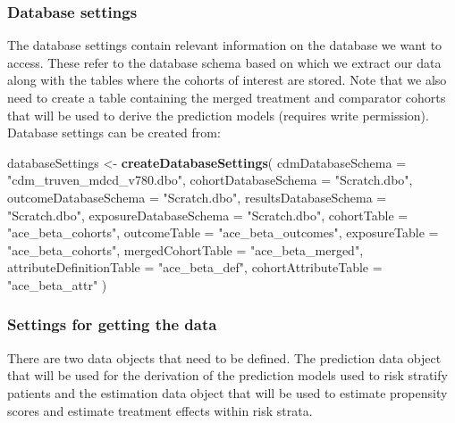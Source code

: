 \documentclass[]{article}
\newenvironment{Shaded}{\begin{snugshade}}{\end{snugshade}}
\newcommand{\DataTypeTok}[1]{\textcolor[rgb]{0.13,0.29,0.53}{#1}}
\newcommand{\KeywordTok}[1]{\textcolor[rgb]{0.13,0.29,0.53}{\textbf{#1}}}
\newcommand{\NormalTok}[1]{#1}
\newcommand{\StringTok}[1]{\textcolor[rgb]{0.31,0.60,0.02}{#1}}
\begin{document}
\hypertarget{database-settings}{%
\subsubsection{Database settings}\label{database-settings}}

The database settings contain relevant information on the database we
want to access. These refer to the database schema based on which we
extract our data along with the tables where the cohorts of interest are
stored. Note that we also need to create a table containing the merged
treatment and comparator cohorts that will be used to derive the
prediction models (requires write permission). Database settings can be
created from:

\begin{Shaded}
\begin{Highlighting}[]
\NormalTok{databaseSettings <{-}}\StringTok{ }\KeywordTok{createDatabaseSettings}\NormalTok{(}
  \DataTypeTok{cdmDatabaseSchema =} \StringTok{"cdm\_truven\_mdcd\_v780.dbo"}\NormalTok{,}
  \DataTypeTok{cohortDatabaseSchema =} \StringTok{"Scratch.dbo"}\NormalTok{,}
  \DataTypeTok{outcomeDatabaseSchema =} \StringTok{"Scratch.dbo"}\NormalTok{,}
  \DataTypeTok{resultsDatabaseSchema =} \StringTok{"Scratch.dbo"}\NormalTok{,}
  \DataTypeTok{exposureDatabaseSchema =} \StringTok{"Scratch.dbo"}\NormalTok{,}
  \DataTypeTok{cohortTable =} \StringTok{"ace\_beta\_cohorts"}\NormalTok{,}
  \DataTypeTok{outcomeTable =} \StringTok{"ace\_beta\_outcomes"}\NormalTok{,}
  \DataTypeTok{exposureTable =} \StringTok{"ace\_beta\_cohorts"}\NormalTok{,}
  \DataTypeTok{mergedCohortTable =} \StringTok{"ace\_beta\_merged"}\NormalTok{,}
  \DataTypeTok{attributeDefinitionTable =} \StringTok{"ace\_beta\_def"}\NormalTok{,}
  \DataTypeTok{cohortAttributeTable =} \StringTok{"ace\_beta\_attr"}
\NormalTok{)}
\end{Highlighting}
\end{Shaded}

\hypertarget{settings-for-getting-the-data}{%
\subsubsection{Settings for getting the
data}\label{settings-for-getting-the-data}}

There are two data objects that need to be defined. The prediction data
object that will be used for the derivation of the prediction models
used to risk stratify patients and the estimation data object that will
be used to estimate propensity scores and estimate treatment effects
within risk strata.
\end{document}
